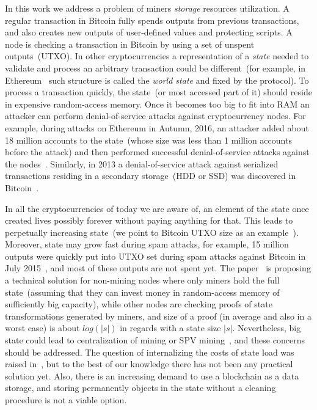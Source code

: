 \documentclass[]{llncs}   %
\begin{document}
In this work we address a problem of miners {\em storage} resources utilization.
A regular transaction in Bitcoin fully spends outputs from previous transactions, and
also creates new outputs of user-defined values and protecting scripts.
A node is checking a transaction in
Bitcoin by using a set of unspent outputs~(UTXO). In other cryptocurrencies a
representation of a {\em state} needed to validate and process an arbitrary
transaction could be different~(for example, in Ethereum~\cite{ethyp} such
structure is called the {\em world state} and fixed by the protocol). To process
a transaction quickly, the state~(or most accessed part of it) should reside in
expensive random-access memory. Once it becomes too big to fit into RAM an attacker can
perform denial-of-service attacks against cryptocurrency nodes. For example,
during attacks on Ethereum in Autumn, 2016, an attacker added about 18 million
accounts to the state~(whose size was less than 1 million accounts before the
attack) and then performed successful denial-of-service attacks against the
nodes~\cite{eth2016dos}. Similarly, in 2013 a denial-of-service attack against
serialized transactions residing in a secondary storage~(HDD or SSD) was
discovered in Bitcoin~\cite{vasek2014empirical}.

In all the cryptocurrencies of today we are aware of, an element of the state once created 
lives possibly forever without paying anything for that. This leads to perpetually increasing state~(we point
to Bitcoin UTXO size as an
example~\cite{utxoChart}). Moreover, state may grow fast during spam attacks, for
example, 15 million outputs were quickly put into UTXO set during spam attacks
against Bitcoin in July 2015~\cite{bitcoin2015flood}, and most of these outputs
are not spent yet. The paper~\cite{reyzin2016improving} is proposing a technical
solution for non-mining nodes where only miners hold the full state~(assuming
that they can invest money in random-access memory of sufficiently big
capacity), while other nodes are checking proofs of state transformations
generated by miners, and size of a proof (in average and also in a worst case)
is about $log(|s|)$ in regards with a state size $|s|$. Nevertheless, big state
could lead to centralization of mining or SPV mining~\cite{spvMining}, and these
concerns should be addressed. The question of internalizing the costs of
state load was raised in~\cite{Moeser2015}, but to the best of our knowledge there has not been any
practical solution yet. Also, there is an increasing demand to use a
blockchain as a data storage, and storing permanently objects in the state
without a cleaning procedure is not a viable option.
\end{document}
